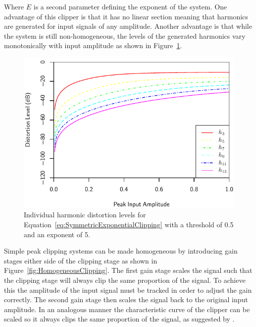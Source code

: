 			Where $E$ is a second parameter defining the exponent of the system. One advantage of this clipper
			is that it has no linear section meaning that harmonics are generated for input signals of any
			amplitude. Another advantage is that while the system is still non-homogeneous, the levels of the
			generated harmonics vary monotonically with input amplitude as shown in
			Figure~\ref{fig:ExponentialClippingHarmonics}.

			\begin{figure}[h!]
				\centering
				\includegraphics{chapter5/Images/ExponentialClippingHarmonics.pdf}
				\caption{Individual harmonic distortion levels for
					 Equation~\ref{eq:SymmetricExponentialClipping} with a threshold of 0.5 and an 
				         exponent of 5.}
				\label{fig:ExponentialClippingHarmonics}
			\end{figure}

			Simple peak clipping systems can be made homogeneous by introducing gain stages either side of the
			clipping stage as shown in Figure~\ref{fig:HomogeneousClipping}. The first gain stage scales the
			signal such that the clipping stage will always clip the same proportion of the signal. To achieve
			this the amplitude of the input signal must be tracked in order to adjust the gain correctly. The
			second gain stage then scales the signal back to the original input amplitude. In an analogous
			manner the characteristic curve of the clipper can be scaled so it always clips the same proportion
			of the signal, as suggested by \citet{deman2014adaptive}.

